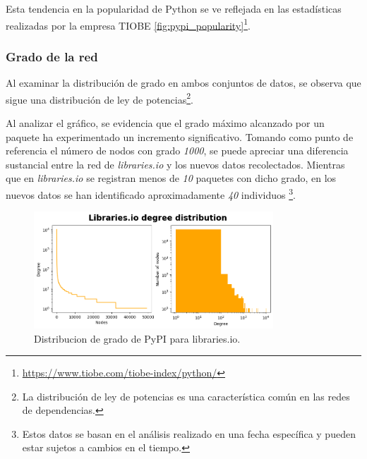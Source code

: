 Esta tendencia en la popularidad de Python se ve reflejada en las estadísticas realizadas por la
empresa TIOBE \ref{fig:pypi_popularity}\footnote{\url{https://www.tiobe.com/tiobe-index/python/}}.


\subsubsection{Grado de la red}

Al examinar la distribución de grado en ambos conjuntos de datos, se observa que sigue una distribución
de ley de potencias\footnote{La distribución de ley de potencias es una característica común en las redes
    de dependencias.}.

Al analizar el gráfico, se evidencia que el grado máximo alcanzado por un paquete ha
experimentado un incremento significativo. Tomando como punto de referencia el número de nodos con grado
\textit{1000}, se puede apreciar una diferencia sustancial entre la red de \textit{libraries.io} y los
nuevos datos recolectados. Mientras que en \textit{libraries.io} se registran menos de \textit{10} paquetes
con dicho grado, en los nuevos datos se han identificado aproximadamente \textit{40} individuos
\footnote{Estos datos se basan en el análisis realizado en una fecha específica y pueden estar sujetos
    a cambios en el tiempo.}.

\begin{figure}[h!]
    \begin{center}
        \includegraphics[width=0.8\textwidth]{img/pypi/librariesio_degree_distribution.png}
        \caption{Distribucion de grado de PyPI para libraries.io.}
        \label{fig:pypi_librariesio_degree_distribution}
    \end{center}
\end{figure}

